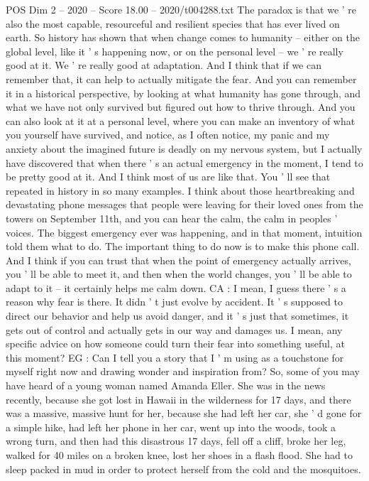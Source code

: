 \begin{textsample}{POS Dim 2 – 2020 – Score 18.00 – 2020/t004288.txt}
The paradox is that we ' re also the most capable, resourceful and resilient species that has ever lived on earth.
So history has shown that when change comes to humanity -- either on the global level, like it ' s happening now, or on the personal level -- we ' re really good at it.
We ' re really good at adaptation.
And I think that if we can remember that, it can help to actually mitigate the fear.
And you can remember it in a historical perspective, by looking at what humanity has gone through, and what we have not only survived but figured out how to thrive through.
And you can also look at it at a personal level, where you can make an inventory of what you yourself have survived, and notice, as I often notice, my panic and my anxiety about the imagined future is deadly on my nervous system, but I actually have discovered that when there ' s an actual emergency in the moment, I tend to be pretty good at it.
And I think most of us are like that.
You ' ll see that repeated in history in so many examples.
I think about those heartbreaking and devastating phone messages that people were leaving for their loved ones from the towers on September 11th, and you can hear the calm, the calm in peoples ' voices.
The biggest emergency ever was happening, and in that moment, intuition told them what to do.
The important thing to do now is to make this phone call.
And I think if you can trust that when the point of emergency actually arrives, you ' ll be able to meet it, and then when the world changes, you ' ll be able to adapt to it -- it certainly helps me calm down.
CA : I mean, I guess there ' s a reason why fear is there.
It didn ' t just evolve by accident.
It ' s supposed to direct our behavior and help us avoid danger, and it ' s just that sometimes, it gets out of control and actually gets in our way and damages us.
I mean, any specific advice on how someone could turn their fear into something useful, at this moment?
EG : Can I tell you a story that I ' m using as a touchstone for myself right now and drawing wonder and inspiration from?
So, some of you may have heard of a young woman named Amanda Eller.
She was in the news recently, because she got lost in Hawaii in the wilderness for 17 days, and there was a massive, massive hunt for her, because she had left her car, she ' d gone for a simple hike, had left her phone in her car, went up into the woods, took a wrong turn, and then had this disastrous 17 days, fell off a cliff, broke her leg, walked for 40 miles on a broken knee, lost her shoes in a flash flood.
She had to sleep packed in mud in order to protect herself from the cold and the mosquitoes.

\end{textsample}
